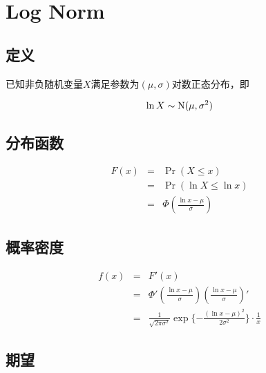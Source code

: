 \section{Log Norm}

\subsection{定义}

已知非负随机变量$X$满足参数为$(\mu,\sigma)$对数正态分布，即

\begin{equation}
    \ln{X} \sim \rm{N}(\mu,\sigma^2)
\end{equation}

\subsection{分布函数}

\begin{equation}
    \begin{array}{rcl}
        F(x) & = & \Pr(X \leq x)                     \\
             & = & \Pr(\ln X \leq \ln x)             \\
             & = & \Phi (\frac{\ln x - \mu}{\sigma})
    \end{array}
\end{equation}

\subsection{概率密度}

\begin{equation}\label{eq_lognorm_prob_density}
    \begin{array}{rcl}
        f(x) & = & F'(x)                                                                                   \\
             & = & \Phi' (\frac{\ln x - \mu}{\sigma}) (\frac{\ln x - \mu}{\sigma})'                        \\
             & = & \frac{1}{\sqrt{2\pi\sigma^2}}\exp\{-\frac{(\ln x - \mu)^2}{2\sigma^2}\}\cdot\frac{1}{x}
    \end{array}
\end{equation}

\subsection{期望}

